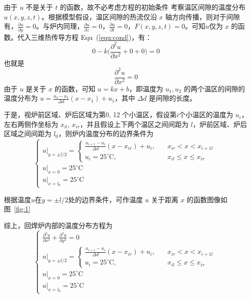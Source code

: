 \documentclass[../main.tex]{subfiles}
\begin{document}
由于 \(u\) 不是关于 \(t\) 的函数，故不必考虑方程的初始条件
考察温区间隙的温度分布 \(u (x,  y , z ,t)\)。根据模型假设，温区间隙的热流仅沿 \(x\) 轴方向传播，则对于间隙有，\(\frac{\partial u}{\partial y} = 0\)。与炉内同理，\(\frac{\partial u}{ \partial z} = 0\)，\(\frac{\partial u}{\partial t} = 0\)，\(F(x, y , z,t) = 0\)。可知\(u\)仅为 \(x\) 的函数。代入三维热传导方程 Equ~(\ref{equ:cond})，有：
\begin{equation}
0 - k \bigg( \frac{\partial ^{2} u}{ \partial x ^{2}} + 0 + 0\bigg) = 0
\end{equation}
也就是
\begin{equation}
\frac{\partial ^{2} u}{\partial x ^{2}} = 0
\end{equation}
由于 \(u\) 是关于 \(x\) 的函数，可知 \(u = kx + b\)，即温度为 \(u_{1} , u_2\) 的两个温区的间隙的温度分布为 \(u = \displaystyle \frac{u_2 - u_1}{\varDelta d} ( x - x_1) + u_1\)，其中 \(\varDelta d\) 是间隙的长度。

于是，视炉前区域、炉后区域为第\(0\), 12 个小温区，假设第\(i\)个小温区的温度为 \(u_{i}\)，左右两侧作坐标为 \(x_{il}\), \(x_{ir}\)，并且假设上下两个温区之间间距为 \(l\)，炉前区域、炉后区域之间间距为 \(l_{0}\)，则炉内温度分布的边界条件为
\begin{equation}
\begin{cases}
u|_{y = \pm l/2} =
\begin{cases}
\frac{u_{i+1} - u_{i}}{\varDelta d} (x - x_{ir}) + u_{i} , & \quad x _{ir} < x < x_{i+1 l} \\
u_{i} = 25 ^{\circ}\mathrm{C}, & \quad  x_{il} \le x \le x_{ir}
\end{cases} \\
u|_{x = 0} = 25 ^{\circ}\mathrm{C}\\
u|_{x = l_{0}} =  25 ^{\circ}\mathrm{C}
\end{cases}
\end{equation}

根据温度\(u\)在\(y=\pm l/2\)处的边界条件，可作温度 \(u\) 关于距离 \(x\) 的函数图像如图~\ref{fig:1}


综上，回焊炉内部的温度分布方程为
\begin{equation}
\begin{cases}
\displaystyle\frac{\partial ^{2} u}{\partial x ^2} + \frac{\partial ^{2} u}{\partial y ^{2}} = 0\\
u|_{y = \pm l/2} =
\begin{cases}
\displaystyle\frac{u_{i+1} - u_{i}}{\varDelta d} (x - x_{ir}) + u_{i} , & \quad x _{ir} < x < x_{i+1 l} \\
\displaystyle u_{i} = 25 ^{\circ}\mathrm{C}, & \quad  x_{il} \le x \le x_{ir}
\end{cases} \\
u|_{x = 0} = 25 ^{\circ}\mathrm{C}\\
u|_{x = l_{0}} =  25 ^{\circ}\mathrm{C}
\end{cases}
\end{equation}
\end{document}
